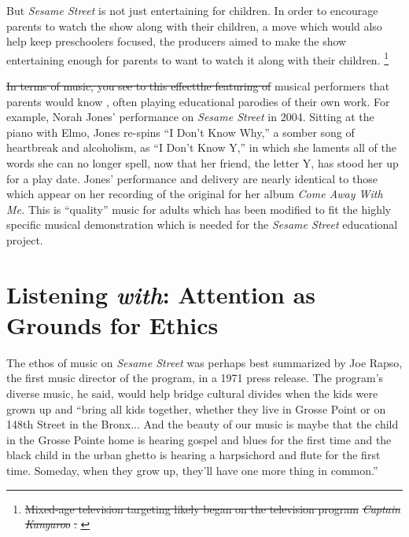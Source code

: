 \documentclass[12pt,letterpaper]{article}
\newcommand{\ses}{\textit{Sesame Street }}
\providecommand{\DIFadd}[1]{{\protect\color{blue}\uwave{#1}}} %
\providecommand{\DIFdel}[1]{{\protect\color{red}\sout{#1}}}                      %
\providecommand{\DIFaddbegin}{} %
\providecommand{\DIFaddend}{} %
\providecommand{\DIFdelbegin}{} %
\providecommand{\DIFdelend}{} %
\newcommand{\DIFscaledelfig}{0.5}
\newlength{\DIFdelgraphicswidth} %
\newlength{\DIFdelgraphicsheight} %
\newcommand{\DIFaddincludegraphics}[2][]{{\color{blue}\fbox{\DIFOincludegraphics[#1]{#2}}}} %
\newcommand{\DIFdelincludegraphics}[2][]{%
\sbox{\DIFdelgraphicsbox}{\DIFOincludegraphics[#1]{#2}}%
\settoboxwidth{\DIFdelgraphicswidth}{\DIFdelgraphicsbox} %
\settoboxtotalheight{\DIFdelgraphicsheight}{\DIFdelgraphicsbox} %
\scalebox{\DIFscaledelfig}{%
\parbox[b]{\DIFdelgraphicswidth}{\usebox{\DIFdelgraphicsbox}\\[-\baselineskip] \rule{\DIFdelgraphicswidth}{0em}}\llap{\resizebox{\DIFdelgraphicswidth}{\DIFdelgraphicsheight}{%
\setlength{\unitlength}{\DIFdelgraphicswidth}%
\begin{picture}(1,1)%
\thicklines\linethickness{2pt} %
{\color[rgb]{1,0,0}\put(0,0){\framebox(1,1){}}}%
{\color[rgb]{1,0,0}\put(0,0){\line( 1,1){1}}}%
{\color[rgb]{1,0,0}\put(0,1){\line(1,-1){1}}}%
\end{picture}%
}\hspace*{3pt}}} %
} %
\DeclareRobustCommand{\DIFaddbegin}{\DIFOaddbegin \let\includegraphics\DIFaddincludegraphics} %
\DeclareRobustCommand{\DIFaddend}{\DIFOaddend \let\includegraphics\DIFOincludegraphics} %
\DeclareRobustCommand{\DIFdelbegin}{\DIFOdelbegin \let\includegraphics\DIFdelincludegraphics} %
\DeclareRobustCommand{\DIFdelend}{\DIFOaddend \let\includegraphics\DIFOincludegraphics} %
\begin{document}
	But \textit{Sesame Street} is not just entertaining for children. 
	In order to encourage parents to watch the show along with their
	children, a move which would also help keep preschoolers focused,
	the producers aimed to make the show entertaining enough for parents
	to want to watch it along with their children.
	\DIFdelbegin %
\footnote{\DIFdel{Mixed-age television targeting likely began on the 
	television program }\textit{\DIFdel{Captain Kangaroo}}%
\DIFdel{. }%
} 
\addtocounter{footnote}{-1}%

\DIFdel{In terms of music, you see to this effectthe featuring of }\DIFdelend \DIFaddbegin \autocites[294]{Ostrofsky2017}[Mixed-age television targeting likely began on the 
	television program \textit{Captain Kangaroo}.][46]{Davis} 
	\DIFadd{To this effect, on \ses }\DIFaddend musical performers that parents would know \DIFaddbegin \DIFadd{are 
	featured}\DIFaddend , often playing educational parodies 
	of their own work. For example, Norah Jones' performance on \ses in 
	2004.\autocite{4081} Sitting at the piano with Elmo, Jones 
	re-spins ``I Don't Know Why,'' a somber song of heartbreak and 
	alcoholism, as ``I Don't Know Y,'' in which she laments all of the 
	words she can no longer spell, now that her friend, the letter Y, has 
	stood her up for a play date. Jones' performance and delivery are nearly
	identical to those which appear on her recording of the original for her
	album \textit{Come Away With Me.} This is ``quality'' music for adults
	which has been modified to fit the highly specific musical demonstration
	which is needed for the \ses educational project.


	\section*{Listening \textit{with}: Attention as Grounds for Ethics}	

	The ethos of music on \textit{Sesame Street} was perhaps best 
	summarized by Joe Rapso, the first music director of the program, in a
	1971 press release. The program's diverse music, he said, would
	help bridge cultural divides when the kids were grown up and ``bring all
	kids together, whether they live in Grosse Point or on 148th Street in 
	the Bronx... And the beauty of our music is maybe that the child in the
	Grosse Pointe home is hearing gospel and blues for the first time and 
	the black child in the urban ghetto is hearing a harpsichord and flute 
	for the first time. Someday, when they grow up, they'll have one more 
	thing in common.''\autocite[297]{Ostrofsky2012}
\end{document}
